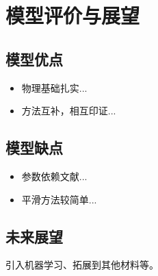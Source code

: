 
\section{模型评价与展望}

\subsection{模型优点}
\begin{itemize}
    \item 物理基础扎实...
    \item 方法互补，相互印证...
\end{itemize}

\subsection{模型缺点}
\begin{itemize}
    \item 参数依赖文献...
    \item 平滑方法较简单...
\end{itemize}

\subsection{未来展望}
引入机器学习、拓展到其他材料等。